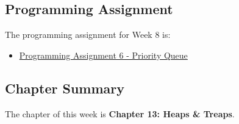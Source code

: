 \subsection{Programming Assignment}

The programming assignment for Week 8 is:

\begin{itemize}
    \item \href{https://github.com/QuantumCompiler/CU/tree/main/CSPB%202270%20-%20Data%20Structures/Assignments/Assignment%206%20-%20Priority%20Queue}{Programming Assignment 6 - Priority Queue}
\end{itemize}

\newpage

\subsection{Chapter Summary}

The chapter of this week is \textbf{Chapter 13: Heaps \& Treaps}.

